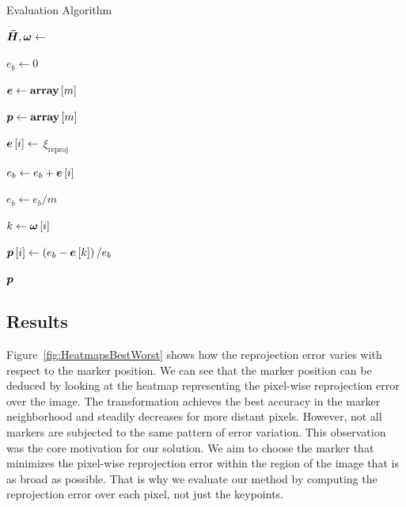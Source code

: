 \begin{algorithm}[t]
    \caption{Evaluation Algorithm}
    \label{alg:EvaluationAlgorithm}
    \begin{algorithmic}[1]
        \State $\boldsymbol{\bar{H}}, \boldsymbol{\omega} \gets $ 

        \State $e_b \gets 0$

        \State $\boldsymbol{e} \gets {\text{\textbf{array}}} \left[ m \right]$

        \State $\boldsymbol{p} \gets {\text{\textbf{array}}} \left[ m \right]$

        \State $\boldsymbol{e} \left[ i \right] \gets $ $\xi_{\text{reproj}}$

        \State $e_b \gets e_b + \boldsymbol{e} \left[ i \right]$
        \EndFor

        \State $e_b \gets e_b / m$

        \State $k \gets \boldsymbol{\omega} \left[ i \right]$

        \State $\boldsymbol{p} \left[ i \right] \gets \left( {e_b - \boldsymbol{e} \left[ k \right]} \right) / e_b$
        \EndFor

        \State \Return $\boldsymbol{p}$
    \end{algorithmic}
\end{algorithm}

\subsection{Results}
\label{ssec:EvaluationResults}

Figure~\ref{fig:HeatmapsBestWorst} shows how the reprojection error varies with respect to the marker position. We can see that the marker position can be deduced by looking at the heatmap representing the pixel-wise reprojection error over the image. The transformation achieves the best accuracy in the marker neighborhood and steadily decreases for more distant pixels. However, not all markers are subjected to the same pattern of error variation. This observation was the core motivation for our solution. We aim to choose the marker that minimizes the pixel-wise reprojection error within the region of the image that is as broad as possible. That is why we evaluate our method by computing the reprojection error over each pixel, not just the keypoints.

